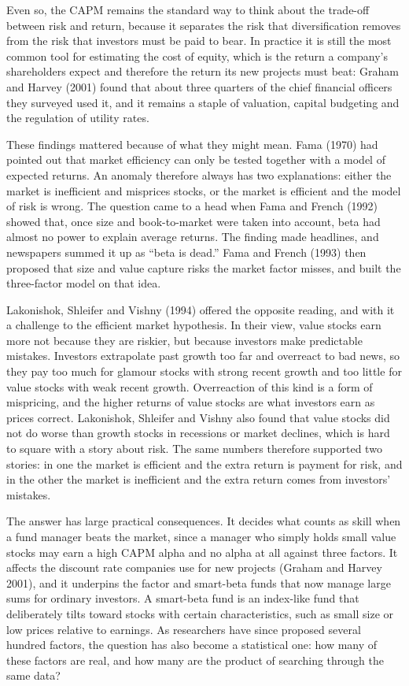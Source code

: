 Even so, the CAPM remains the standard way to think about the trade-off between risk and return, because it separates the risk that diversification removes from the risk that investors must be paid to bear. In practice it is still the most common tool for estimating the cost of equity, which is the return a company's shareholders expect and therefore the return its new projects must beat: Graham and Harvey (2001) found that about three quarters of the chief financial officers they surveyed used it, and it remains a staple of valuation, capital budgeting and the regulation of utility rates. 

These findings mattered because of what they might mean. 
Fama (1970) had pointed out that market efficiency can only be tested together with a model of expected returns. An anomaly therefore always has two explanations: either the market is inefficient and misprices stocks, or the market is efficient and the model of risk is wrong.
The question came to a head when Fama and French (1992) showed that, once size and book-to-market were taken into account, beta had almost no power to explain average returns. The finding made headlines, and newspapers summed it up as ``beta is dead.'' Fama and French (1993) then proposed that size and value capture risks the market factor misses, and built the three-factor model on that idea. 

Lakonishok, Shleifer and Vishny (1994) offered the opposite reading, and with it a challenge to the efficient market hypothesis. In their view, value stocks earn more not because they are riskier, but because investors make predictable mistakes. Investors extrapolate past growth too far and overreact to bad news, so they pay too much for glamour stocks with strong recent growth and too little for value stocks with weak recent growth. Overreaction of this kind is a form of mispricing, and the higher returns of value stocks are what investors earn as prices correct. Lakonishok, Shleifer and Vishny also found that value stocks did not do worse than growth stocks in recessions or market declines, which is hard to square with a story about risk. The same numbers therefore supported two stories: in one the market is efficient and the extra return is payment for risk, and in the other the market is inefficient and the extra return comes from investors' mistakes.

The answer has large practical consequences. It decides what counts as skill when a fund manager beats the market, since a manager who simply holds small value stocks may earn a high CAPM alpha and no alpha at all against three factors. It affects the discount rate companies use for new projects (Graham and Harvey 2001), and it underpins the factor and smart-beta funds that now manage large sums for ordinary investors. A smart-beta fund is an index-like fund that deliberately tilts toward stocks with certain characteristics, such as small size or low prices relative to earnings. As researchers have since proposed several hundred factors, the question has also become a statistical one: how many of these factors are real, and how many are the product of searching through the same data? 

